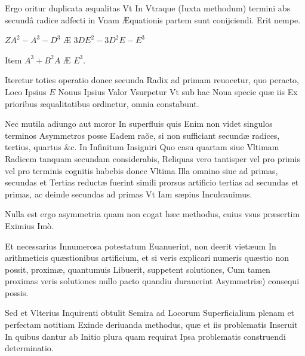 \documentclass[11pt,a4paper]{article}
\begin{document}
Ergo oritur duplicata æqualitas Vt In Vtraque (Iuxta methodum) termini abs secundâ radice adfecti in Vnam Æquationis partem sunt conijciendi. Erit nempe.

$ZA^2 - A^3 - D^3$ Æ $3DE^2 - 3D^2E - E^3$

Item $A^3 + B^2A$ Æ $E^3$.

Iteretur toties operatio donec secunda Radix ad primam reuocetur, quo peracto, Loco Ipsius $E$ Nouus Ipsius Valor Vsurpetur Vt sub hac Noua specie quæ iis Ex prioribus æqualitatibus ordinetur, omnia constabunt.

Nec mutila adiungo aut moror In superfluis quis Enim non videt singulos terminos Asymmetros posse Eadem raõe, si non sufficiant secundæ radices, tertius, quartus \&c. In Infinitum Insigniri Quo casu quartam siue Vltimam Radicem tanquam secundam considerabis, Reliquas vero tantisper vel pro primis vel pro terminis cognitis habebis donec Vltima Illa omnino  siue ad primas, secundas et Tertias reductæ fuerint simili prorsus artificio tertias ad secundas et primas, ac deinde secundas ad primas Vt Iam sæpius Inculcauimus.

Nulla est ergo asymmetria quam non cogat  hæc methodus, cuius vsus præsertim Eximius Imò.


Et necessarius Innumerosa potestatum Euanuerint, non deerit vietæum In arithmeticis quæstionibus artificium, et si veris explicari numeris quæstio non possit, proximæ, quantumuis Libuerit, suppetent solutiones, Cum tamen proximas veris solutiones nullo pacto quandiu durauerint Asymmetriæ) consequi possis.

Sed et Vlterius Inquirenti obtulit Semira ad Locorum Superficialium plenam et perfectam notitiam Exinde deriuanda methodus, quæ et iis problematis Inseruit In quibus dantur ab Initio plura quam requirat Ipsa problematis construendi determinatio.
\end{document}
